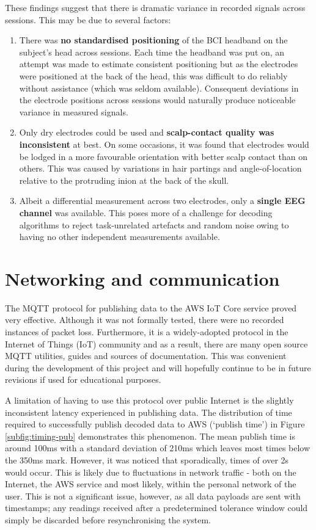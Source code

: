 These findings suggest that there is dramatic variance in recorded signals across sessions. This may be due to several factors:
\begin{enumerate}
    \item There was \textbf{no standardised positioning} of the BCI headband on the subject's head across sessions. Each time the headband was put on, an attempt was made to estimate consistent positioning but as the electrodes were positioned at the back of the head, this was difficult to do reliably without assistance (which was seldom available). Consequent deviations in the electrode positions across sessions would naturally produce noticeable variance in measured signals.
    \item Only dry electrodes could be used and \textbf{scalp-contact quality was inconsistent} at best. On some occasions, it was found that electrodes would be lodged in a more favourable orientation with better scalp contact than on others. This was caused by variations in hair partings and angle-of-location relative to the protruding inion at the back of the skull. 
    \item Albeit a differential measurement across two electrodes, only a \textbf{single EEG channel} was available. This poses more of a challenge for decoding algorithms to reject task-unrelated artefacts and random noise owing to having no other independent measurements available.  
\end{enumerate}

\section{Networking and communication}
The MQTT protocol for publishing data to the AWS IoT Core service proved very effective. Although it was not formally tested, there were no recorded instances of packet loss. Furthermore, it is a widely-adopted protocol in the Internet of Things (IoT) community and as a result, there are many open source MQTT utilities, guides and sources of documentation. This was convenient during the development of this project and will hopefully continue to be in future revisions if used for educational purposes.

A limitation of having to use this protocol over public Internet is the slightly inconsistent latency experienced in publishing data. The distribution of time required to successfully publish decoded data to AWS (`publish time') in Figure \ref{subfig:timing-pub} demonstrates this phenomenon. The mean publish time is around 100ms with a standard deviation of 210ms which leaves most times below the 350ms mark. However, it was noticed that sporadically, times of over 2s would occur. This is likely due to fluctuations in network traffic - both on the Internet, the AWS service and most likely, within the personal network of the user. This is not a significant issue, however, as all data payloads are sent with timestamps; any readings received after a predetermined tolerance window could simply be discarded before resynchronising the system.

